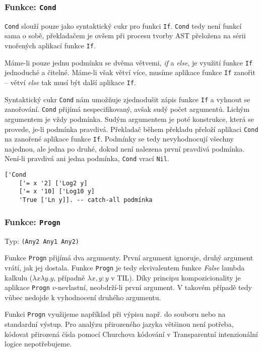 \subsubsection*{Funkce: \lstinline{Cond}}

\lstinline{Cond} slouží pouze jako syntaktický cukr pro funkci \lstinline{If}. \lstinline{Cond} tedy
není funkcí sama o sobě, překladačem je ovšem při procesu tvorby AST přeložena na sérii vnořených
aplikací funkce \lstinline{If}.

Máme-li pouze jednu podmínku se dvěma větvemi, \textit{if} a \textit{else}, je využití funkce
\lstinline{If} jednoduché a čitelné. Máme-li však větví více, musíme aplikace funkce \lstinline{If}
zanořit -- větví \textit{else} tak musí být další aplikace \lstinline{If}.

Syntaktický cukr \lstinline{Cond} nám umožňuje zjednodušit zápis funkce \lstinline{If} a vyhnout
se zanořování. \lstinline{Cond} přijímá nespecifikovaný, avšak sudý počet argumentů. Lichým
argumentem je vždy podmínka. Sudým argumentem je poté konstrukce, která se provede, je-li podmínka
pravdivá. Překladač během překladu přeloží aplikaci \lstinline{Cond} na zanořené aplikace funkce
\lstinline{If}. Podmínky se tedy nevyhodnocují všechny najednou, ale jedna po druhé, dokud není
nalezena první pravdivá podmínka. Není-li pravdivá ani jedna podmínka, \lstinline{Cond} vrací
\lstinline{Nil}.

\begin{lstlisting}[caption={Ukázka využití Cond}]
['Cond
    ['= x '2] ['Log2 y]
    ['= x '10] ['Log10 y]
    'True ['Ln y]]. -- catch-all podmínka
\end{lstlisting}

\subsubsection*{Funkce: \lstinline{Progn}}\label{progn-fn}
Typ: \lstinline{(Any2 Any1 Any2)}

Funkce \lstinline{Progn} přijímá dva argumenty. První argument ignoruje, druhý argument vrátí, jak
jej dostala. Funkce \lstinline{Progn} je tedy ekvivalentem funkce \textit{False} lambda kalkulu
($\lambda x \lambda y . y$, případně $\lambda x, y: y$ v TIL). Díky principu kompozicionality je aplikace
\lstinline{Progn} $v$-nevlastní, neobdrží-li první argument. V takovém případě tedy vůbec nedojde
k vyhodnocení druhého argumentu.

Funkci \lstinline{Progn} využijeme například při výpisu např. do souboru nebo na standardní výstup.
Pro analýzu přirozeného jazyka většinou není potřeba, kódovat přirozená čísla pomocí Churchova
kódování v Transparentní intenzionální logice nepotřebujeme.

